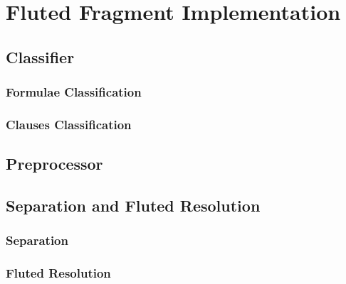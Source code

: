 \chapter{Fluted Fragment Implementation}\label{chap:fluted-fragment-implementation}
\section{Classifier}
\subsection{Formulae Classification}
\subsection{Clauses Classification}
\section{Preprocessor}
\section{Separation and Fluted Resolution}
\subsection{Separation}
\subsection{Fluted Resolution}




